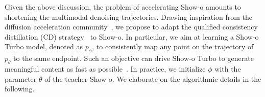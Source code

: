 Given the above discussion, the problem of accelerating Show-o amounts to shortening the multimodal denoising trajectories. 
Drawing inspiration from the diffusion acceleration community~\cite{salimans2022progressive,song2023consistency,sauer2025adversarial,liu2023instaflow}, 
we propose to adapt the qualified consistency distillation (CD) strategy~\cite{song2023consistency} to Show-o. 
In particular, we aim at learning a Show-o Turbo model, denoted as $p_\phi$, to consistently map any point on the trajectory of $p_\theta$ to the same endpoint. 
Such an objective can drive Show-o Turbo to generate meaningful content as fast as possible~\cite{song2023consistency,luo2023latent,song2023improved}. 
In practice, we initialize $\phi$ with the parameter $\theta$ of the teacher Show-o. 
We elaborate on the algorithmic details in the following. 

